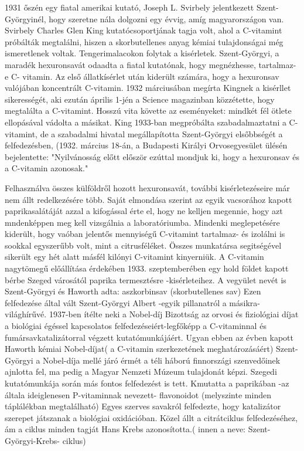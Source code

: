 \documentclass[10pt, conference,a4paper]{ITKproc}
\begin{document}
1931 őszén egy fiatal amerikai kutató, Joseph L. Svirbely jelentkezett Szent-Györgyinél, hogy szeretne nála dolgozni egy évvig, amíg magyarországon van.
Svirbely Charles Glen King kutatócsoportjának tagja volt, ahol a C-vitamint próbálták megtalálni, hiszen a skorbutellenes anyag kémiai tulajdonságai még ismeretlenek voltak. Tengerimalacokon folytak a kisérletek.
Szent-Györgyi, a maradék hexuronsavát odaadta a fiatal kutatónak, hogy megnézhesse, tartalmaz- e C- vitamin.
Az első állatkísérlet után kiderült számára, hogy a hexuronsav valójában koncentrált C-vitamin.
1932 márciusában megírta Kingnek  a kisérllet sikerességét, aki ezután április 1-jén a Science magazinban közzétette, hogy megtalálta a C-vitamint.
Hosszú vita követte az eseményeket: mindkét fél ötlete ellopásával vádolta a másikat. 
King 1933-ban megpróbálta szabadalmaztatni a C-vitamint, de a szabadalmi hivatal megállapította Szent-Györgyi elsőbbségét a felfedezésben,
(1932. március 18-án, a Budapesti Királyi Orvosegyesület ülésén bejelentette: "Nyilvánosság előtt először ezúttal mondjuk ki, hogy a hexuronsav és a C-vitamin azonosak." 

Felhasználva összes külföldről hozott hexuronsavát, további kisérletezéseire már nem állt redelkezésére több.
Saját elmondása szerint az egyik vacsorához kapott paprikasalátáját azzal a kifogással érte el, hogy ne kelljen megennie, hogy azt mndenképpen meg kell vizsgálnia a laboratóriumba. Mindenki meglepetésére kiderült, hogy vaóban jelentős mennyiségű C-vitamint tartalmaz- és izolálni is sookkal egyszerűbb volt, mint a citrusféléket.
Összes munkatársa segitségével sikerült egy hét alatt másfél kilónyi C-vitamint kinyerniük.
A C-vitamin nagytömegű előállítása érdekében 1933. szeptemberében egy hold földet kapott bérbe Szeged városától paprika termesztésre -kisérleteihez.
A vegyület nevét is Szent-Györgyi és Haworth adta: aszkorbinsav (skorbutellenes sav)
Ezen felfedezése által vált Szent-Györgyi Albert -egyik pillanatról a másikra- világhírűvé.
1937-ben ítélte neki a Nobel-díj Bizottság az orvosi és fiziológiai díjat a biológiai égéssel kapcsolatos felfedezéseiért-legfőképp a C-vitaminnal és fumársavkatalizátorral végzett kutatómunkájáért.
Ugyan ebben az évben kapott Haworth kémiai Nobel-díjat( a C-vitamin szerkezetének meghatározásáért)
Szent-Györgyi a Nobel-díja mellé járó érmét a téli háború finnországi szenvedőinek ajnlotta fel, ma pedig a Magyar Nemzeti Múzeum tulajdonát képzi.
Szegedi kutatómunkája során más fontos felfedezést is tett. Kmutatta a paprikában -az általa ideiglenesen P-vitaminnak nevezett- flavonoidot (melyszinte minden táplálékban megtalálható)
Egyes szerves savakról felfedezte, hogy katalizátor szerepet játszanak a biológiai oxidációban.
Közel állt a citrátciklus felfedezéséhez, ám a ciklus minden tagját Hans Krebs azonosította.( innen a neve: Szent-Györgyi-Krebs- ciklus)
\end{document}
